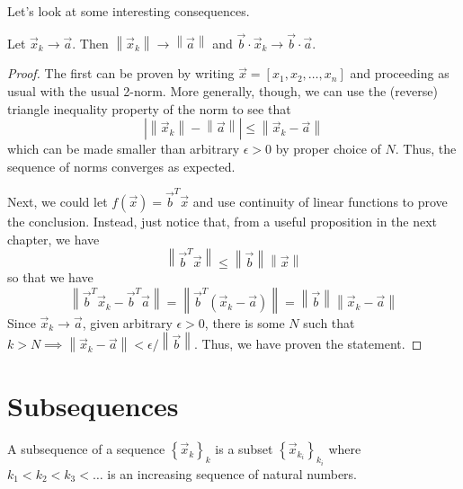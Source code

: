 Let's look at some interesting consequences.

\begin{prop}
Let $\vec{x}_k \rightarrow \vec{a}$. Then $\left\lVert \vec{x}_k \right\rVert \rightarrow \left\lVert \vec{a} \right\rVert$ and $\vec{b}\cdot \vec{x}_k \rightarrow \vec{b}\cdot \vec{a}$.
\end{prop}
\begin{proof}
The first can be proven by writing $\vec{x} = \left[ x_1, x_2,\ldots,x_n\right]$ and proceeding as usual with the usual 2-norm. More generally, though, we can use the (reverse) triangle inequality property of the norm to see that \[ \left| \left\lVert \vec{x}_k \right\rVert - \left\lVert \vec{a} \right\rVert \right| \leq \left\lVert \vec{x}_k - \vec{a} \right\rVert \] which can be made smaller than arbitrary $\epsilon > 0$ by proper choice of $N$. Thus, the sequence of norms converges as expected.

Next, we could let $f\left(\vec{x} \right) = \vec{b}^T \vec{x}$ and use continuity of linear functions to prove the conclusion. Instead, just notice that, from a useful proposition in the next chapter, we have \[ \left\lVert \vec{b}^T \vec{x} \right\rVert \leq \left\lVert \vec{b} \right\rVert \left\lVert \vec{x}\right\rVert \] so that we have \[ \left\lVert \vec{b}^T \vec{x}_k - \vec{b}^T \vec{a} \right\rVert = \left\lVert \vec{b}^T \left( \vec{x}_k-\vec{a} \right) \right\rVert = \left\lVert \vec{b} \right\rVert \left\lVert \vec{x}_k - \vec{a} \right\rVert \] Since $\vec{x}_k \rightarrow \vec{a}$, given arbitrary $\epsilon >0$, there is some $N$ such that $k>N \implies \left\lVert \vec{x}_k -\vec{a} \right\rVert < \epsilon / \left\lVert \vec{b} \right\rVert $. Thus, we have proven the statement.

\end{proof}



\section{Subsequences}
A subsequence of a sequence $\left\{ \vec{x}_k\right\}_{k}$ is a subset $\left\{ \vec{x}_{k_i} \right\}_{k_i}$ where $k_1 < k_2 < k_3 < \ldots$ is an increasing sequence of natural numbers. 

